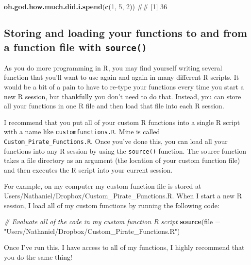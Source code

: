 \documentclass[]{book}
\newenvironment{Shaded}{\begin{snugshade}}{\end{snugshade}}
\newcommand{\KeywordTok}[1]{\textcolor[rgb]{0.13,0.29,0.53}{\textbf{#1}}}
\newcommand{\DataTypeTok}[1]{\textcolor[rgb]{0.13,0.29,0.53}{#1}}
\newcommand{\DecValTok}[1]{\textcolor[rgb]{0.00,0.00,0.81}{#1}}
\newcommand{\StringTok}[1]{\textcolor[rgb]{0.31,0.60,0.02}{#1}}
\newcommand{\CommentTok}[1]{\textcolor[rgb]{0.56,0.35,0.01}{\textit{#1}}}
\newcommand{\NormalTok}[1]{#1}
\theoremstyle{definition}
\theoremstyle{definition}
\theoremstyle{remark}
\begin{document}
\begin{Shaded}
\begin{Highlighting}[]
\KeywordTok{oh.god.how.much.did.i.spend}\NormalTok{(}\KeywordTok{c}\NormalTok{(}\DecValTok{1}\NormalTok{, }\DecValTok{5}\NormalTok{, }\DecValTok{2}\NormalTok{))}
\NormalTok{## [1] 36}
\end{Highlighting}
\end{Shaded}

\subsection{\texorpdfstring{Storing and loading your functions to and
from a function file with
\texttt{source()}}{Storing and loading your functions to and from a function file with source()}}\label{storing-and-loading-your-functions-to-and-from-a-function-file-with-source}

As you do more programming in R, you may find yourself writing several
function that you'll want to use again and again in many different R
scripts. It would be a bit of a pain to have to re-type your functions
every time you start a new R session, but thankfully you don't need to
do that. Instead, you can store all your functions in one R file and
then load that file into each R session.

I recommend that you put all of your custom R functions into a single R
script with a name like \texttt{customfunctions.R}. Mine is called
\texttt{Custom\_Pirate\_Functions.R}. Once you've done this, you can
load all your functions into any R session by using the
\texttt{source()} function. The source function takes a file directory
as an argument (the location of your custom function file) and then
executes the R script into your current session.

For example, on my computer my custom function file is stored at
Users/Nathaniel/Dropbox/Custom\_Pirate\_Functions.R. When I start a new
R session, I load all of my custom functions by running the following
code:

\begin{Shaded}
\begin{Highlighting}[]
\CommentTok{# Evaluate all of the code in my custom function R script}
\KeywordTok{source}\NormalTok{(}\DataTypeTok{file =} \StringTok{"Users/Nathaniel/Dropbox/Custom_Pirate_Functions.R"}\NormalTok{)}
\end{Highlighting}
\end{Shaded}

Once I've run this, I have access to all of my functions, I highly
recommend that you do the same thing!
\end{document}
